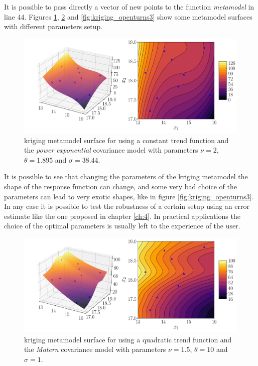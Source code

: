 \newpage

It is possible to pass directly a vector of new points to the function \textit{metamodel} in line 44. Figures \ref{fig:kriging_openturns}, \ref{fig:kriging_openturns2} and \ref{fig:kriging_openturns3} show some metamodel surfaces with different parameters setup.

\begin{figure}[t!]
\centering
\includegraphics[width=0.9\linewidth]{appendix_a/kriging_openturns}
\caption{kriging metamodel surface for using a constant trend function and the \textit{power exponential} covariance model with parameters $\nu=2$, $\theta=1.895$ and $\sigma=38.44$.}
\label{fig:kriging_openturns}
\end{figure}

It is possible to see that changing the parameters of the kriging metamodel the shape of the response function can change, and some very bad choice of the parameters can lead to very exotic shapes, like in figure \ref{fig:kriging_openturns3}. In any case it is possible to test the robustness of a certain setup using an error estimate like the one proposed in chapter \ref{ch:4}. In practical applications the choice of the optimal parameters is usually left to the experience of the user.

\begin{figure}[h]
	\centering
	\includegraphics[width=0.9\linewidth]{appendix_a/kriging_openturns2}
	\caption{kriging metamodel surface for using a quadratic trend function and the \textit{Matern} covariance model with parameters $\nu=1.5$, $\theta=10$ and $\sigma=1$.}
	\label{fig:kriging_openturns2}
\end{figure}

